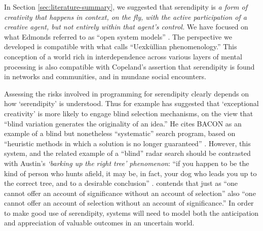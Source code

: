In Section \ref{sec:literature-summary}, we suggested that serendipity
is \emph{a form of creativity that happens in context, on the fly,
  with the active participation of a creative agent, but not entirely
  within that agent's control.}  We have focused on what Edmonds
referred to as ``open system models'' \cite{Edmonds1994}.  The
perspective we developed is compatible with what
\citet{tonnessen2015uexkullian} calls ``Uexk\"ullian phenomenology.''
This conception of a world rich in interdependence across various
layers of mental processing is also compatible with Copeland's
\cite{copeland2017serendipity} assertion that serendipity is found in
networks and communities, and in mundane social encounters.

Assessing the risks involved in programming for serendipity clearly
depends on how `serendipity' is understood.  Thus for example
\citet[p.~158]{simonton2010creative} has suggested that `exceptional
creativity' is more likely to engage blind selection mechanisms, on
the view that ``blind variation generates the originality of an
idea.''  He cites {\sf BACON} \cite{langley1987scientific} as an
example of a blind but nonetheless ``systematic'' search program,
based on ``heuristic methods in which a solution is no longer
guaranteed'' \cite[p.~169]{simonton2010creative}.  However, this
system, and the related example of a ``blind'' radar search
\cite[p.~383]{campbell1960blind} should be contrasted with Austin's
\emph{`barking up the right tree' phenomenon}: ``if you happen to be
the kind of person who hunts afield, it may be, in fact, your dog who
leads you up to the correct tree, and to a desirable conclusion''
\cite[p.~50]{austin1978chase}.
\citet[p.~720]{kockelman2011biosemiosis} contends that just as ``one
cannot offer an account of significance without an account of
selection'' also ``one cannot offer an account of selection without an
account of significance.''  In order to make good use of serendipity,
systems will need to model both the anticipation and appreciation of
valuable outcomes in an uncertain world.

